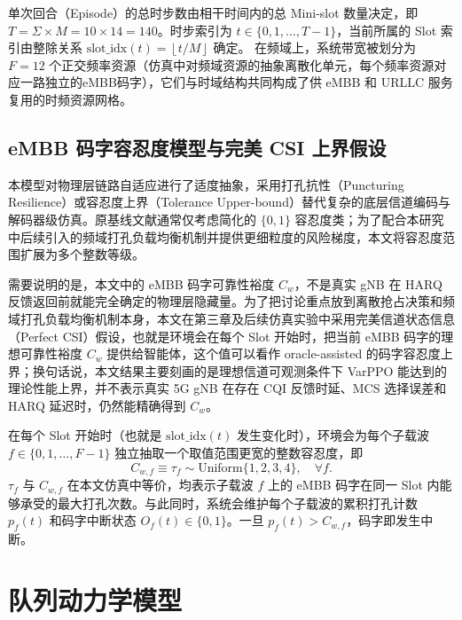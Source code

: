 单次回合（Episode）的总时步数由相干时间内的总 Mini-slot 数量决定，即 \(T = \Sigma \times M = 10 \times 14 = 140\)。时步索引为 \(t \in \{0, 1, \ldots, T-1\}\)，当前所属的 Slot 索引由整除关系 \(\text{slot\_idx}(t) = \left\lfloor t/M \right\rfloor\) 确定。
在频域上，系统带宽被划分为 \(F = 12\) 个正交频率资源（仿真中对频域资源的抽象离散化单元，每个频率资源对应一路独立的eMBB码字），它们与时域结构共同构成了供 eMBB 和 URLLC 服务复用的时频资源网格。

\subsection{eMBB 码字容忍度模型与完美 CSI 上界假设}\label{312-embb-ux7801ux5b57ux5bb9ux5fcdux5ea6ux6a21ux578b}

本模型对物理层链路自适应进行了适度抽象，采用打孔抗性（Puncturing Resilience）或容忍度上界（Tolerance Upper-bound）替代复杂的底层信道编码与解码器级仿真。原基线文献通常仅考虑简化的 \(\{0, 1\}\) 容忍度类\cite{saggese2021}；为了配合本研究中后续引入的频域打孔负载均衡机制\cite{alsenwi2021}并提供更细粒度的风险梯度，本文将容忍度范围扩展为多个整数等级。

需要说明的是，本文中的 eMBB 码字可靠性裕度 \(C_w\)，不是真实 gNB 在 HARQ 反馈返回前就能完全确定的物理层隐藏量。为了把讨论重点放到离散抢占决策和频域打孔负载均衡机制本身，本文在第三章及后续仿真实验中采用完美信道状态信息（Perfect CSI）假设，也就是环境会在每个 Slot 开始时，把当前 eMBB 码字的理想可靠性裕度 \(C_w\) 提供给智能体，这个值可以看作 oracle-assisted 的码字容忍度上界；换句话说，本文结果主要刻画的是理想信道可观测条件下 VarPPO 能达到的理论性能上界，并不表示真实 5G gNB 在存在 CQI 反馈时延、MCS 选择误差和 HARQ 延迟时，仍然能精确得到 \(C_w\)。

在每个 Slot 开始时（也就是 \(\text{slot\_idx}(t)\) 发生变化时），环境会为每个子载波 \(f \in \{0,1,\ldots,F-1\}\) 独立抽取一个取值范围更宽的整数容忍度，即
\begin{equation}
C_{w,f} \equiv \tau_f \sim \text{Uniform}\{1, 2, 3, 4\}, \quad \forall f.
\label{eq:codeword_tolerance_distribution}
\end{equation}
\(\tau_f\) 与 \(C_{w,f}\) 在本文仿真中等价，均表示子载波 \(f\) 上的 eMBB 码字在同一 Slot 内能够承受的最大打孔次数。与此同时，系统会维护每个子载波的累积打孔计数 \(p_f(t)\) 和码字中断状态 \(O_f(t) \in \{0, 1\}\)。一旦 \(p_f(t) > C_{w,f}\)，码字即发生中断。


\section{队列动力学模型}\label{32-ux961fux5217ux52a8ux529bux5b66ux6a21ux578b}

